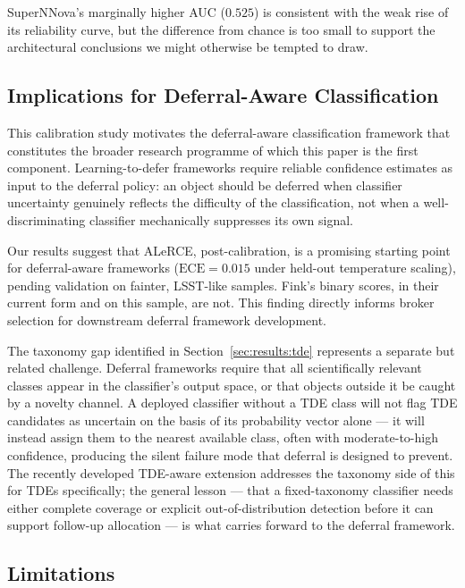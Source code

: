 SuperNNova's marginally higher AUC ($0.525$) is consistent with the
weak rise of its reliability curve, but the difference from chance
is too small to support the architectural conclusions
\citep{Moller2019, Villar2019} we might otherwise be tempted to
draw.

\subsection{Implications for Deferral-Aware Classification}
\label{sec:discussion:deferral}

This calibration study motivates the deferral-aware 
classification framework that constitutes the broader 
research programme of which this paper is the first component. 
Learning-to-defer frameworks \citep{Madras2018, Mozannar2020} 
require reliable confidence estimates as input to the deferral 
policy: an object should be deferred when classifier uncertainty 
genuinely reflects the difficulty of the classification, not 
when a well-discriminating classifier mechanically suppresses 
its own signal.

Our results suggest that ALeRCE, post-calibration, is a promising
starting point for deferral-aware frameworks
($\mathrm{ECE} = 0.015$ under held-out temperature scaling), pending
validation on fainter, LSST-like samples. Fink's binary scores, in
their current form and on this sample, are not. This finding
directly informs broker selection for downstream deferral framework
development.

The taxonomy gap identified in Section~\ref{sec:results:tde}
represents a separate but related challenge. Deferral frameworks
require that all scientifically relevant classes appear in the
classifier's output space, or that objects outside it be caught by a
novelty channel. A deployed classifier without a TDE class will not
flag TDE candidates as uncertain on the basis of its probability
vector alone — it will instead assign them to the nearest available
class, often with moderate-to-high confidence, producing the silent
failure mode that deferral is designed to prevent. The recently
developed TDE-aware extension \citep{Pavez-Herrera2025} addresses the
taxonomy side of this for TDEs specifically; the general lesson — that
a fixed-taxonomy classifier needs either complete coverage or explicit
out-of-distribution detection before it can support follow-up
allocation — is what carries forward to the deferral framework.

\subsection{Limitations}
\label{sec:discussion:limitations}


